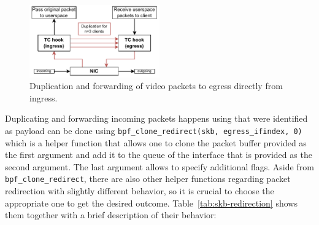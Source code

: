 \begin{figure}[htbp]
    \centering
    \includegraphics[width=0.5\textwidth]{figures/03_fast_relays/packet-forwarding.drawio.pdf}
    \caption[Video packet duplication]{Duplication and forwarding of video packets to egress directly 
    from ingress.}\label{fig:packet-forwarding-duplication}
\end{figure}

Duplicating and forwarding incoming packets happens using that were identified as payload 
can be done using \verb|bpf_clone_redirect(skb, egress_ifindex, 0)| which is a helper function
that allows one to clone the packet buffer provided as the first argument and add it to the 
queue of the interface that is provided as the second argument.
The last argument allows to specify additional flags.
Aside from \verb|bpf_clone_redirect|, there are also other helper functions regarding packet
redirection with slightly different behavior, so it is crucial to choose the appropriate one
to get the desired outcome.
Table~\ref{tab:skb-redirection} shows them together with a brief description of their behavior:

